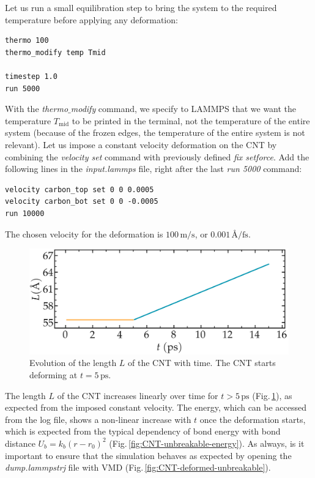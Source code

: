 \documentclass[9pt,tutorial]{livecoms}
\begin{document}
Let us run a small equilibration step to bring the system to the required temperature before applying any deformation:
{\normalsize \begin{verbatim}
thermo 100
thermo_modify temp Tmid

timestep 1.0
run 5000
\end{verbatim}}
With the \textit{thermo$\_$modify} command, we specify to LAMMPS that we want the temperature $T_\mathrm{mid}$ to be printed in the terminal, not the temperature of the entire system (because of the frozen edges, the temperature of the entire system is not relevant). Let us impose a constant velocity deformation on the CNT by combining the \textit{velocity set} command with previously defined \textit{fix setforce}. Add the following lines in the \textit{input.lammps} file, right after the last \textit{run 5000} command:
{\normalsize \begin{verbatim}
velocity carbon_top set 0 0 0.0005
velocity carbon_bot set 0 0 -0.0005
run 10000
\end{verbatim}}
\noindent The chosen velocity for the deformation is $100\,\text{m/s}$, or $0.001\,\text{Å/fs}$.

\begin{figure}
\centering
\includegraphics[width=\linewidth]{CNT-lenght-unbreakable}
\caption{Evolution of the length $L$ of the CNT with time. The CNT starts deforming at $t = 5\,\text{ps}$.}
\label{fig:CNT-unbreakable-lenght}
\end{figure}

The length $L$ of the CNT increases linearly over time for $t > 5\,\text{ps}$ (Fig.\,\ref{fig:CNT-unbreakable-lenght}), as expected from the imposed constant velocity. The energy, which can be accessed from the log file, shows a non-linear increase with $t$ once the deformation starts, which is expected from the typical dependency of bond energy with bond distance $U_b = k_b \left( r - r_0 \right)^2$ (Fig.\,\ref{fig:CNT-unbreakable-energy}). As always, is it important to ensure that the simulation behaves as expected by opening the \textit{dump.lammpstrj} file with VMD (Fig.\,\ref{fig:CNT-deformed-unbreakable}).
\end{document}
